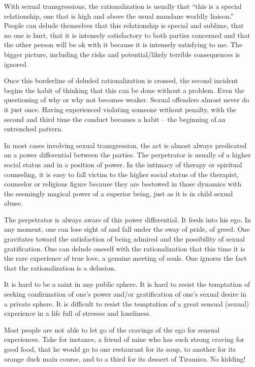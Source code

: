 \documentclass[]{book}
\begin{document}
With sexual transgressions, the rationalization is usually that ``this is a special relationship, one that is high and above the usual mundane worldly liaison.'' People can delude themselves that this relationship is special and sublime, that no one is hurt, that it is intensely satisfactory to both parties concerned and that the other person will be ok with it because it is intensely satisfying to me. The bigger picture, including the risks and potential/likely terrible consequences is ignored.

Once this borderline of deluded rationalization is crossed, the second incident begins the habit of thinking that this can be done without a problem. Even the questioning of why or why not becomes weaker. Sexual offenders almost never do it just once. Having experienced violating someone without penalty, with the second and third time the conduct becomes a habit -- the beginning of.an entrenched pattern.

In most cases involving sexual transgression, the act is almost always predicated on a power differential between the parties. The perpetrator is usually of a higher social status and in a position of power. In the intimacy of therapy or spiritual counseling, it is easy to fall victim to the higher social status of the therapist, counselor or religious figure because they are bestowed in those dynamics with the seemingly magical power of a superior being, just as it is in child sexual abuse.

The perpetrator is always aware of this power differential. It feeds into his ego. In any moment, one can lose sight of and fall under the sway of pride, of greed. One gravitates toward the satisfaction of being admired and the possibility of sexual gratification. One can delude oneself with the rationalization that this time it is the rare experience of true love, a genuine meeting of souls. One ignores the fact that the rationalization is a delusion.

It is hard to be a saint in any public sphere. It is hard to resist the temptation of seeking confirmation of one's power and/or gratification of one's sexual desire in a private sphere. It is difficult to resist the temptation of a great sensual (sexual) experience in a life full of stresses and loneliness.

Most people are not able to let go of the cravings of the ego for sensual experiences. Take for instance, a friend of mine who has such strong craving for good food, that he would go to one restaurant for its soup, to another for its orange duck main course, and to a third for its dessert of Tiramisu. No kidding!
\end{document}
